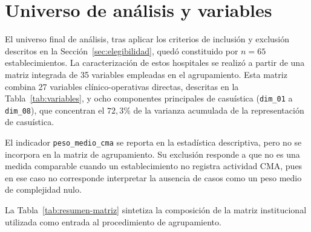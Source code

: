 \section{Universo de análisis y variables}
\label{sec:universo}

El universo final de análisis, tras aplicar los criterios de inclusión y
exclusión descritos en la Sección~\ref{sec:elegibilidad}, quedó constituido por
$n=65$ establecimientos. La caracterización de estos hospitales se realizó a
partir de una matriz integrada de 35 variables empleadas en el agrupamiento. Esta
matriz combina 27 variables clínico-operativas directas, descritas en la
Tabla~\ref{tab:variables}, y ocho componentes principales de casuística
(\texttt{dim\_01} a \texttt{dim\_08}), que concentran el $72{,}3\%$ de la
varianza acumulada de la representación de casuística.

El indicador \texttt{peso\_medio\_cma} se reporta en la estadística descriptiva,
pero no se incorpora en la matriz de agrupamiento. Su exclusión responde a que no
es una medida comparable cuando un establecimiento no registra actividad CMA,
pues en ese caso no corresponde interpretar la ausencia de casos como un peso
medio de complejidad nulo.

La Tabla~\ref{tab:resumen-matriz} sintetiza la composición de la matriz
institucional utilizada como entrada al procedimiento de agrupamiento.

